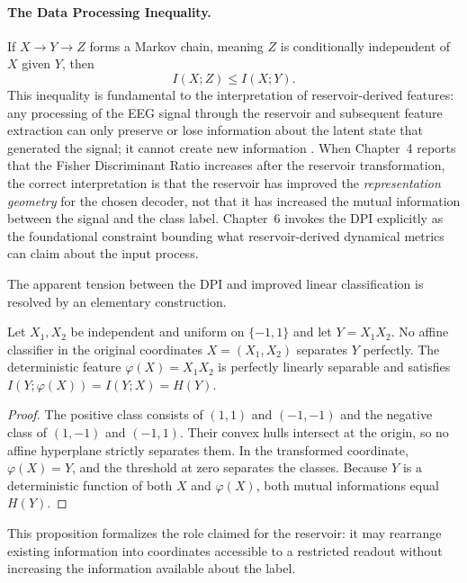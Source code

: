 \paragraph{The Data Processing Inequality.}
If $X \to Y \to Z$ forms a Markov chain, meaning $Z$ is conditionally independent of $X$ given $Y$, then
\begin{equation}
    I(X; Z) \leq I(X; Y).
    \label{eq:dpi}
\end{equation}
This inequality is fundamental to the interpretation of reservoir-derived features: any processing of the EEG signal through the reservoir and subsequent feature extraction can only preserve or lose information about the latent state that generated the signal; it cannot create new information \cite{cover_elements_2006}. When Chapter~4 reports that the Fisher Discriminant Ratio increases after the reservoir transformation, the correct interpretation is that the reservoir has improved the \emph{representation geometry} for the chosen decoder, not that it has increased the mutual information between the signal and the class label. Chapter~6 invokes the DPI explicitly as the foundational constraint bounding what reservoir-derived dynamical metrics can claim about the input process.

The apparent tension between the DPI and improved linear classification is
resolved by an elementary construction.

\begin{proposition}
\label{prop:xor_geometry}
Let $X_1,X_2$ be independent and uniform on $\{-1,1\}$ and let
$Y=X_1X_2$. No affine classifier in the original coordinates
$X=(X_1,X_2)$ separates $Y$ perfectly. The deterministic feature
$\varphi(X)=X_1X_2$ is perfectly linearly separable and satisfies
$I(Y;\varphi(X))=I(Y;X)=H(Y)$.
\end{proposition}

\begin{proof}
The positive class consists of $(1,1)$ and $(-1,-1)$ and the negative class of
$(1,-1)$ and $(-1,1)$. Their convex hulls intersect at the origin, so no affine
hyperplane strictly separates them. In the transformed coordinate,
$\varphi(X)=Y$, and the threshold at zero separates the classes. Because $Y$
is a deterministic function of both $X$ and $\varphi(X)$, both mutual
informations equal $H(Y)$.
\end{proof}

This proposition formalizes the role claimed for the reservoir: it may rearrange
existing information into coordinates accessible to a restricted readout without
increasing the information available about the label.

